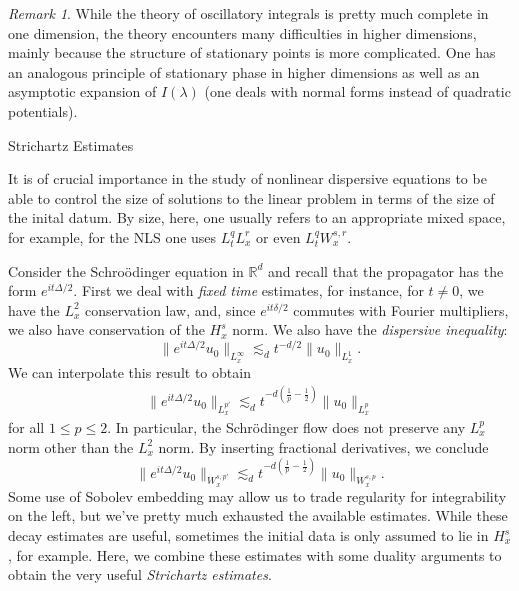 \documentclass[11pt]{article}
\theoremstyle{remark}
\newtheorem*{rmk}{Remark}
\newcommand{\1}{\textbf{1}}
\newcommand{\lle}{\lesssim}
\def\norm#1{\| #1  \|}
\newcommand{\bbR}{\mathbb{R}}
\begin{document}
\begin{rmk}
While the theory of oscillatory integrals is pretty much complete in one dimension, the theory encounters many difficulties in higher dimensions, mainly because the structure of stationary points is more complicated. One has an analogous principle of stationary phase in higher dimensions as well as an asymptotic expansion of $I(\lambda)$ (one deals with normal forms instead of quadratic potentials).
\end{rmk}
\newpage
{\noindent\Large Strichartz Estimates}
\vspace{6mm}

It is of crucial importance in the study of nonlinear dispersive equations to be able to control the size of solutions to the linear problem in terms of the size of the inital datum. By size, here, one usually refers to an appropriate mixed space, for example, for the NLS one uses $L_t^q L_x^r$ or even $L_t^q W_x^{s,r}$.

Consider the Schro\"odinger equation in $\bbR^d$ and recall that the propagator has the form $e^{it\Delta/2}$. First we deal with \emph{fixed time} estimates, for instance, for $t \neq 0$, we have the $L^2_x$ conservation law, and, since $e^{it\delta/2}$ commutes with Fourier multipliers, we also have conservation of the $H^s_x$ norm. We also have the \emph{dispersive inequality}:
\[
\norm{e^{it\Delta/2}u_0}_{L^\infty_x} \lle_d t^{-d/2} \norm{u_0}_{L^1_x}.
\]
We can interpolate this result to obtain
\begin{align}
\norm{e^{it\Delta/2}u_0}_{L^{p'}_x} \lle_d t^{-d(\frac{1}{p} - \frac{1}{2})} \norm{u_0}_{L^p_x}
\label{eq:lpbds}
\end{align}
for all $1 \leq p \leq 2$. In particular, the Schr\"odinger flow does not preserve any $L^p_x$ norm other than the $L^2_x$ norm. By inserting fractional derivatives, we conclude
\[
\norm{e^{it\Delta/2}u_0}_{W^{s,p'}_x} \lle_d t^{-d(\frac{1}{p} - \frac{1}{2})} \norm{u_0}_{W^{s,p}_x}.
\]
Some use of Sobolev embedding may allow us to trade regularity for integrability on the left, but we've pretty much exhausted the available estimates. While these decay estimates are useful, sometimes the initial data is only assumed to lie in $H^s_x$, for example. Here, we combine these estimates with some duality arguments to obtain the very useful \emph{Strichartz estimates}.
\end{document}
